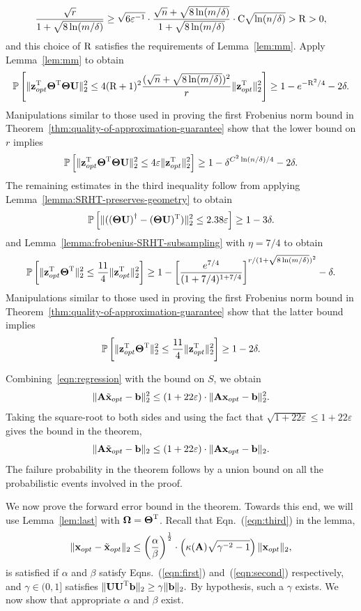 \[
{\sqrt{r}\over 1 + \sqrt{8 \ln(m/\delta)}} \geq \sqrt{6\varepsilon^{-1}} \cdot {\sqrt{n} + \sqrt{8 \ln(m/\delta)}\over 1 + \sqrt{8 \ln(m/\delta)}} \cdot \mathrm{C} \sqrt{\ln(n/\delta)} > \mathrm{R} > 0,
\]
and this choice of $\mathrm{R}$ satisfies the requirements of Lemma~\ref{lem:mm}. Apply Lemma~\ref{lem:mm} to obtain
\[
\mbox{}{\mathbb{P}}\left[ \mbox{}\| {\mathbf z}_{opt}^{\textsc{T}} {\bm{\mathrm{\Theta}}}^{\textsc{T}} {\bm{\mathrm{\Theta}}} {\bm{\mathrm{U}}}\|_2^2 \le 4 (\mathrm{R} + 1)^2 {(\sqrt{n} + \sqrt{8 \ln(m/\delta)})^2\over r} \mbox{}\|{\mathbf z}_{opt}^{\textsc{T}} \|_2^2\right]
\geq 1-e^{-\mathrm{R}^2/4}-2\delta.
\]
Manipulations similar to those used in proving the first Frobenius norm bound in Theorem~\ref{thm:quality-of-approximation-guarantee} show that the lower bound on $r$ implies
\[
 \mbox{}{\mathbb{P}}\left[ \mbox{}\|{\mathbf z}_{opt}^{\textsc{T}} {\bm{\mathrm{\Theta}}}^{\textsc{T}} {\bm{\mathrm{\Theta}}} {\bm{\mathrm{U}}}\|_2^2 \le 4 \varepsilon \mbox{}\|{\mathbf z}_{opt}^{\textsc{T}}\|_2^2 \right] \geq 1 - \delta^{C^2 \ln(n/\delta)/4} - 2\delta.
\]
The remaining estimates in the third inequality follow from applying Lemma~\ref{lemma:SRHT-preserves-geometry} to obtain
\[
\mbox{}{\mathbb{P}}\left[ \mbox{}\|( {( {\bm{\mathrm{\Theta}}} {\bm{\mathrm{U}}})}^\dagger - ({\bm{\mathrm{\Theta}}} {\bm{\mathrm{U}}})^{\textsc{T}} )\|_2^2 \le 2.38 \varepsilon\right] \geq 1 - 3\delta.
\]
and Lemma~\ref{lemma:frobenius-SRHT-subsampling} with $\eta=7/4$ to obtain
\[
 \mbox{}{\mathbb{P}}\left[\mbox{}\|{\mathbf z}_{opt}^{\textsc{T}} {\bm{\mathrm{\Theta}}}^{\textsc{T}}\|_2^2 \le  {11\over 4} \mbox{}\|{\mathbf z}_{opt}^{\textsc{T}}  \|_2^2\right] \geq 1 - \left[ {e^{7/4}\over  (1 + 7/4)^{1 + 7/4} } \right]^{r/(1 + \sqrt{8 \ln(m/\delta)})^2} - \delta.
\]
Manipulations similar to those used in proving the first Frobenius norm bound in Theorem~\ref{thm:quality-of-approximation-guarantee} show that the latter bound implies
\[
 \mbox{}{\mathbb{P}}\left[\mbox{}\|{\mathbf z}_{opt}^{\textsc{T}} {\bm{\mathrm{\Theta}}}^{\textsc{T}}\|_2^2 \le  {11\over 4} \mbox{}\|{\mathbf z}_{opt}^{\textsc{T}}  \|_2^2\right] \geq 1 - 2\delta.
\]


Combining~\eqref{eqn:regression} with the bound on $S$, we obtain
\[
\mbox{}\|{\bm{\mathrm{A}}} \tilde{{\mathbf x}}_{opt}-{\mathbf b} \|_2^2 \le  \left( 1 +  22\varepsilon \right) \cdot \mbox{}\|{\bm{\mathrm{A}}} {\mathbf x}_{opt}-{\mathbf b}\|_2^2.
\]
Taking the square-root to both sides and using the fact that $\sqrt{1 +  22 \varepsilon} \le 1 +  22 \varepsilon$ gives the bound in the theorem,
\[
\mbox{}\|{\bm{\mathrm{A}}} \tilde{{\mathbf x}}_{opt}-{\mathbf b} \|_2 \le  \left( 1 +  22 \varepsilon \right) \cdot \mbox{}\|{\bm{\mathrm{A}}} {\mathbf x}_{opt}-{\mathbf b}\|_2.
\]
The failure probability in the theorem follows by a union bound on all the probabilistic events involved in the proof.

We now prove the forward error bound in the theorem. Towards this end, we will use Lemma~\ref{lem:last} with ${\bm{\mathrm{\Omega}}} = {\bm{\mathrm{\Theta}}}^{\textsc{T}}$.
Recall that Eqn.~(\ref{eqn:third}) in the lemma,
$$  \mbox{}\| {\mathbf x}_{opt} - \tilde{{\mathbf x}}_{opt} \|_2 \le \left( {\alpha\over \beta} \right)^{{1\over 2}} \cdot \left( \kappa{ \left( {\ensuremath{\bm{\mathrm{A}}}}\right)} \sqrt{ \gamma^{-2}   - 1 } \right) \mbox{}\|{\mathbf x}_{opt}\|_2,
$$
is satisfied if $\alpha$ and $\beta$ satisfy Eqns.~(\ref{eqn:first}) and~(\ref{eqn:second}) respectively, and $\gamma \in (0,1]$ satisfies $\mbox{}\|{\bm{\mathrm{U}}} {\bm{\mathrm{U}}}^{\textsc{T}} {\mathbf b}\|_2 \geq \gamma \mbox{}\|{\mathbf b}\|_2.$ By hypothesis, such a $\gamma$ exists. We now show that appropriate $\alpha$ and $\beta$ exist.

